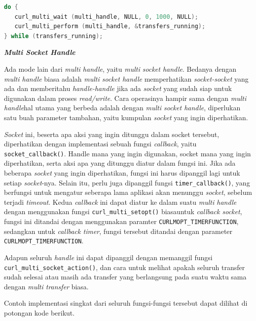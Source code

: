\documentclass[a4paper,twoside]{article}
\begin{document}
\begin{enumerate}
\begin{lstlisting}[language=C, caption=Loop sederhana dari pengunaan \textit{multi handle} curl, label=code:curl-usage-multi]
do {
   curl_multi_wait (multi_handle, NULL, 0, 1000, NULL);
   curl_multi_perform (multi_handle, &transfers_running);
} while (transfers_running);
\end{lstlisting}

\textbf{\textit{Multi Socket Handle}}
\label{sec:cmodules-libcurl-handlemultisocket}

Ada mode lain dari \textit{multi handle}, yaitu \textit{multi socket handle}. Bedanya dengan \textit{multi handle} biasa adalah \textit{multi socket handle} memperhatikan \textit{socket-socket} yang ada dan memberitahu \textit{handle-handle} jika ada \textit{socket} yang sudah siap untuk digunakan dalam proses \textit{read/write}. Cara operasinya hampir sama dengan \textit{multi handle}\textemdash hal utama yang berbeda adalah dengan \textit{multi socket handle}, diperlukan satu buah parameter tambahan, yaitu kumpulan \textit{socket} yang ingin diperhatikan.

\textit{Socket} ini, beserta apa aksi yang ingin ditunggu dalam socket tersebut, diperhatikan dengan implementasi sebuah fungsi \textit{callback}, yaitu \verb|socket_callback()|. Handle mana yang ingin digunakan, socket mana yang ingin diperhatikan, serta aksi apa yang ditunggu diatur dalam fungsi ini. Jika ada \mbox{beberapa} \textit{socket} yang ingin diperhatikan, fungsi ini harus dipanggil lagi untuk setiap \textit{socket}-nya. Selain itu, \linebreak perlu juga dipanggil fungsi \verb|timer_callback()|, yang berfungsi untuk mengatur seberapa lama aplikasi akan menunggu \textit{socket}, sebelum terjadi \textit{timeout}. Kedua \textit{callback} ini dapat diatur ke dalam suatu \textit{\mbox{multi} handle} dengan menggunakan fungsi \verb|curl_multi_setopt()| biasa\textemdash untuk \textit{callback socket}, fungsi ini ditandai dengan menggunakan paramter \verb|CURLMOPT_TIMERFUNCTION|, sedangkan untuk \textit{callback timer}, fungsi tersebut ditandai dengan parameter \verb|CURLMOPT_TIMERFUNCTION|.

Adapun seluruh \textit{handle} ini dapat dipanggil dengan memanggil fungsi \verb|curl_multi_socket_action()|, dan cara untuk melihat apakah seluruh transfer sudah selesai atau masih ada transfer yang berlangsung pada suatu waktu sama dengan \textit{multi transfer} biasa.

Contoh implementasi singkat dari seluruh fungsi-fungsi tersebut dapat dilihat di potongan kode berikut.


\end{enumerate}
\end{document}
